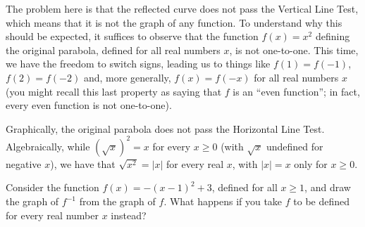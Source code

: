 \documentclass[nooutcomes]{ximera}
\begin{document}
\begin{example}
\begin{explanation}
    The problem here is that the reflected curve does not pass the Vertical Line Test, which means that it is not the graph of any function. To understand why this should be expected, it suffices to observe that the function $f(x) = x^2$ defining the original parabola, defined for all real numbers $x$, is not one-to-one. This time, we have the freedom to switch signs, leading us to things like $f(1) = f(-1)$, $f(2) = f(-2)$ and, more generally, $f(x) = f(-x)$ for all real numbers $x$ (you might recall this last property as saying that $f$ is an ``even function''; in fact, every even function is not one-to-one).

    Graphically, the original parabola does not pass the Horizontal Line Test. Algebraically, while $(\sqrt{x})^2  = x$ for every $x \geq 0$ (with $\sqrt{x}$ undefined for negative $x$), we have that $\sqrt{x^2} = |x|$ for every real $x$, with $|x| = x$ only for $x\geq 0$.

  \end{explanation}
\end{example}

\begin{exploration}
  Consider the function $f(x) = -(x-1)^2+3$, defined for all $x\geq 1$, and draw the graph of $f^{-1}$ from the graph of $f$. What happens if you take $f$ to be defined for every real number $x$ instead?
\end{exploration}
\end{document}

